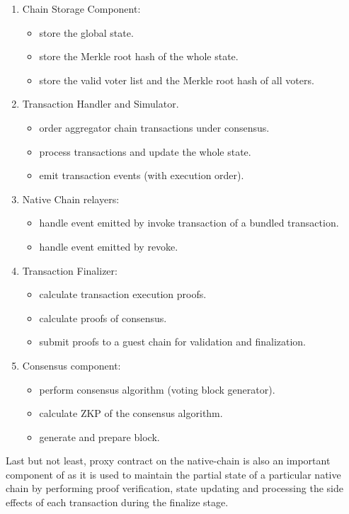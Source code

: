 \begin{enumerate}[leftmargin=*]
\item Chain Storage Component:
    \begin{itemize}
    \item store the global state.
    \item store the Merkle root hash of the whole state.
    \item store the valid voter list and the Merkle root hash of all voters.
    \end{itemize}
\item Transaction Handler and Simulator.
    \begin{itemize}
    \item order aggregator chain transactions under consensus.
    \item process transactions and update the whole state.
    \item emit transaction events (with execution order).
    \end{itemize}
\item Native Chain relayers:
    \begin{itemize}
    \item handle event emitted by invoke transaction of a bundled transaction.
    \item handle event emitted by revoke.
    \end{itemize}
\item Transaction Finalizer:
    \begin{itemize}
    \item calculate transaction execution proofs.
    \item calculate proofs of consensus.
    \item submit proofs to a guest chain for validation and finalization.
    \end{itemize}
\item Consensus component:
    \begin{itemize}
    \item perform consensus algorithm (voting block generator).
    \item calculate ZKP of the consensus algorithm.
    \item generate and prepare block.
    \end{itemize}
\end{enumerate}

Last but not least, proxy contract on the native-chain is also an important component of \dprotocol as it is used to maintain the partial state of a particular native chain by performing proof verification, state updating and processing the side effects of each transaction during the finalize stage.  


